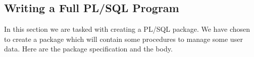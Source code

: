 \subsection{Writing a Full PL/SQL Program}

In this section we are tasked with creating a PL/SQL package. We have chosen to create a package which will contain some procedures to manage some user data. Here are the package specification and the body.

